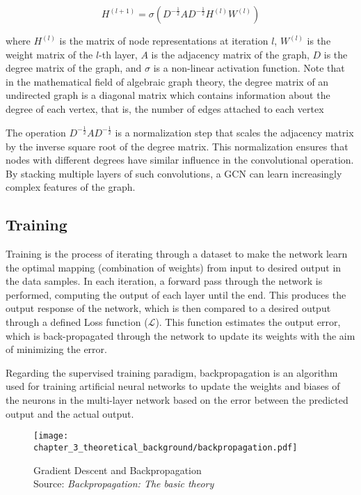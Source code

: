 \begin{equation}
H^{(l+1)} = \sigma(D^{-\frac{1}{2}} A D^{-\frac{1}{2}} H^{(l)} W^{(l)})
\end{equation}

where $H^{(l)}$ is the matrix of node representations at iteration $l$, $W^{(l)}$ is the weight matrix of the $l$-th layer, $A$ is the adjacency matrix of the graph, $D$ is the degree matrix of the graph, and $\sigma$ is a non-linear activation function. Note that in the mathematical field of algebraic graph theory, the degree matrix of an undirected graph is a diagonal matrix which contains information about the degree of each vertex, that is, the number of edges attached to each vertex

The operation $D^{-\frac{1}{2}} A D^{-\frac{1}{2}}$ is a normalization step that scales the adjacency matrix by the inverse square root of the degree matrix. This normalization ensures that nodes with different degrees have similar influence in the convolutional operation. By stacking multiple layers of such convolutions, a \ac{GCN} can learn increasingly complex features of the graph.

\subsection{Training}
\label{subsec:3_training}

Training is the process of iterating through a dataset to make the network learn the optimal mapping (combination of weights) from input to desired output in the data samples. In each iteration, a forward pass through the network is performed, computing the output of each layer until the end. This produces the output response of the network, which is then compared to a desired output through a defined Loss function ($\mathcal{L}$). This function estimates the output error, which is back-propagated through the network to update its weights with the aim of minimizing the error. 

Regarding the supervised training paradigm, backpropagation \cite{rumelhart1995backpropagation} is an algorithm used for training artificial neural networks to update the weights and biases of the neurons in the multi-layer network based on the error between the predicted output and the actual output.

\begin{figure}[h]
	\centering
	\texttt{[image: chapter\_3\_theoretical\_background/backpropagation.pdf]}
	\caption[Gradient Descent and Backpropagation]{Gradient Descent and Backpropagation \\ 
	Source: \textit{Backpropagation: The basic theory} \cite{rumelhart1995backpropagation}}
	\label{fig:chapter_3_theoretical_background/backpropagation}
\end{figure}

